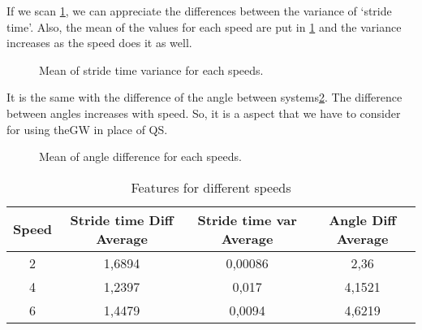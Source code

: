 If we scan \ref{fig:speed_var_stride_time}, we can appreciate the differences between the variance of ‘stride time’. Also, the mean of the values for each speed are put in \ref{tab:speeds} and the variance increases as the speed does it as well.

\begin{figure}[H]
	\centering
	\caption{Mean of stride time variance for each speeds.}
	\label{fig:speed_var_stride_time}
\end{figure}

It is the same with the difference of the angle between systems\ref{fig:speed_angle}. The difference between angles increases with speed. So, it is a aspect that we have to consider for using theGW in place of QS.

\begin{figure}[H]
	\centering
	\caption{Mean of angle difference for each speeds.}
	\label{fig:speed_angle}
\end{figure}

\begin{table}[h]
	\caption{Features for different speeds}	
	\centering
	\begin{tabular}{|c|c|c|c|}\hline
		
		Speed & Stride time Diff Average & Stride time var Average & Angle Diff Average	 	\\ \hline
		2  & 1,6894	 & 0,00086 & 2,36 \\
		4 & 1,2397	& 0,017 & 4,1521\\
		6 & 1,4479 & 0,0094	& 4,6219
		\\ \hline
	\end{tabular}
	\label{tab:speeds}
	
\end{table}
